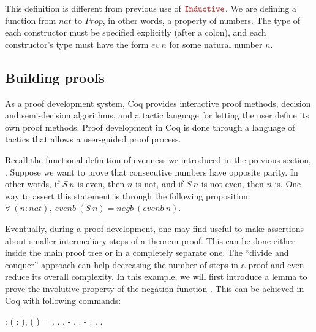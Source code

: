 This definition is different from previous use of $ \coqdockw{Inductive} $. We are defining a function from $ nat $ to $ Prop $, in other words, a property of numbers. The type of each constructor must be specified explicitly (after a colon), and each constructor's type must have the form $ ev \ n $ for some natural number $ n $.

\subsection{Building proofs}

As a proof development system, Coq provides interactive proof methods, decision and semi-decision algorithms, and a tactic language for letting the user define its own proof methods. Proof development in Coq is done through a language of tactics that allows a user-guided proof process.

Recall the functional definition of evenness we introduced in the previous section, . Suppose we want to prove that consecutive numbers have opposite parity. In other words, if $ S \ n $ is even, then $ n $ is not, and if $ S \ n $ is not even, then $ n $ is. One way to assert this statement is through the following proposition: $ \forall \ (n:nat), \ evenb \ (S \ n) = negb \ (evenb \ n) $.

Eventually, during a proof development, one may find useful to make assertions about smaller intermediary steps of a theorem proof. This can be done either inside the main proof tree or in a completely separate one. The ``divide and conquer'' approach can help decreasing the number of steps in a proof and even reduce its overall complexity. In this example, we will first introduce a lemma to prove the involutive property of the negation function . This can be achieved in Coq with following commands:

\begin{coqdoccode}
	\coqdocemptyline
	\coqdocnoindent
	  : \coqdockw{\ensuremath{\forall}} ( : ),\coqdoceol
	\coqdocindent{1.00em}
	 ( ) = .\coqdoceol
	\coqdocnoindent
	.\coqdoceol
	\coqdocindent{1.00em}
	 .\coqdoceol
	\coqdocindent{1.00em}
	- . .\coqdoceol
	\coqdocindent{1.00em}
	- . .\coqdoceol
	\coqdocnoindent
	.\coqdoceol
\end{coqdoccode}

